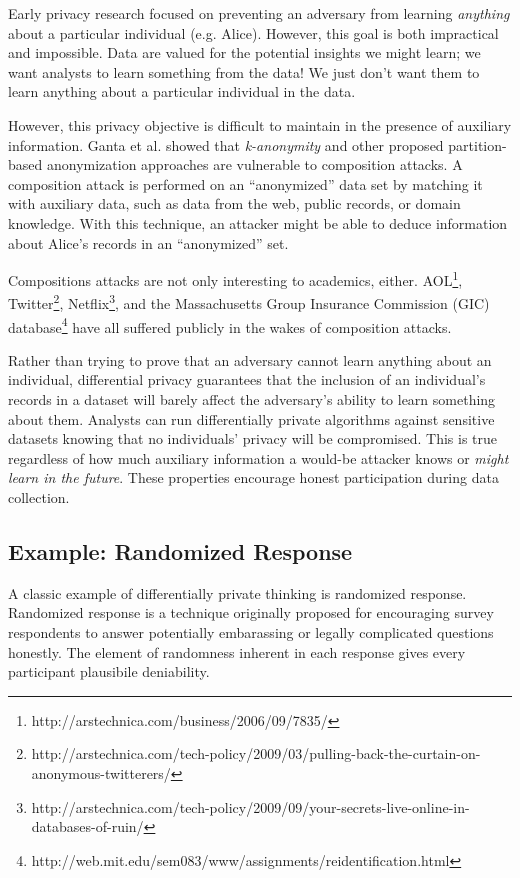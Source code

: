 \documentclass[12pt]{report}
\begin{document}
Early privacy research focused on preventing an adversary from learning \textit{anything} about a particular individual (e.g. Alice).
However, this goal is both impractical and impossible.
Data are valued for the potential insights we might learn;
we want analysts to learn something from the data!
We just don't want them to learn anything about a particular individual in the data.

However, this privacy objective is difficult to maintain in the presence of auxiliary information.
Ganta et al. showed that \textit{k-anonymity} and other proposed partition-based anonymization approaches are vulnerable to composition attacks\cite{ganta2008composition}.
A composition attack is performed on an ``anonymized'' data set by matching it with auxiliary data, such as data from the web, public records, or domain knowledge.
With this technique, an attacker might be able to deduce information about Alice's records in an ``anonymized'' set.

Compositions attacks are not only interesting to academics, either.
AOL\footnote{\label{fn:aol} http://arstechnica.com/business/2006/09/7835/}, Twitter\footnote{\label{fn:twitter}http://arstechnica.com/tech-policy/2009/03/pulling-back-the-curtain-on-anonymous-twitterers/}, Netflix\footnote{\label{fn:netflix}http://arstechnica.com/tech-policy/2009/09/your-secrets-live-online-in-databases-of-ruin/}, and the Massachusetts Group Insurance Commission (GIC) database\footnote{\label{fn:gic}http://web.mit.edu/sem083/www/assignments/reidentification.html} have all suffered publicly in the wakes of composition attacks.

Rather than trying to prove that an adversary cannot learn anything about an individual, differential privacy guarantees that the inclusion of an individual's records in a dataset will barely affect the adversary's ability to learn something about them.
Analysts can run differentially private algorithms against sensitive datasets knowing that no individuals' privacy will be compromised.
This is true regardless of how much auxiliary information a would-be attacker knows or \textit{might learn in the future}\cite{journals/cacm/Dwork11}.
These properties encourage honest participation during data collection.

\subsection{Example: Randomized Response}

A classic example of differentially private thinking is randomized response.
Randomized response is a technique originally proposed for encouraging survey respondents to answer potentially embarassing or legally complicated questions honestly\cite{warner1965randomized}.
The element of randomness inherent in each response gives every participant plausibile deniability.
\end{document}

